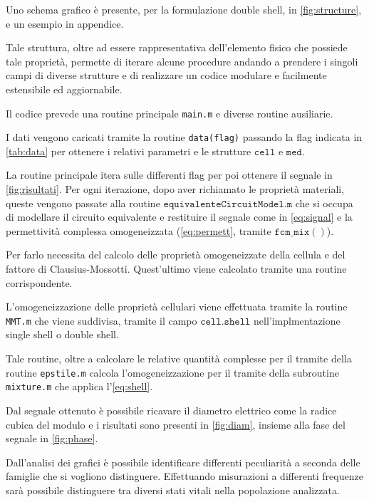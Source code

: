 Uno schema grafico è presente, per la formulazione double shell, in \cref{fig:structure}, e un esempio in appendice.

Tale struttura, oltre ad essere rappresentativa dell'elemento fisico che possiede tale proprietà, permette di iterare alcune procedure andando a prendere i singoli campi di diverse strutture e di realizzare un codice modulare e facilmente estensibile ed aggiornabile.

Il codice prevede una routine principale \texttt{main.m} e diverse routine ausiliarie.

I dati vengono caricati tramite la routine \texttt{data(flag)} passando la flag indicata in \cref{tab:data} per ottenere i relativi parametri e le strutture $\mathtt{cell}$ e $\mathtt{med}$.

La routine principale itera sulle differenti flag per poi ottenere il segnale in \cref{fig:risultati}. Per ogni iterazione, dopo aver richiamato le proprietà materiali, queste vengono passate alla routine $\mathtt{equivalenteCircuitModel.m}$ che si occupa di modellare il circuito equivalente e restituire il segnale come in \cref{eq:signal} e la permettività complessa omogeneizzata (\cref{eq:permett}, tramite $\mathtt{fcm\_mix()}$).

Per farlo necessita del calcolo delle proprietà omogeneizzate della cellula e del fattore di Clausius-Mossotti. Quest'ultimo viene calcolato tramite una routine corrispondente. 

L'omogeneizzazione delle proprietà cellulari viene effettuata tramite la routine \texttt{MMT.m} che viene suddivisa, tramite il campo $\mathtt{cell.shell}$ nell'implmentazione single shell o double shell.  

Tale routine, oltre a calcolare le relative quantità complesse per il tramite della routine \texttt{epstile.m} calcola l'omogeneizzazione per il tramite della subroutine \texttt{mixture.m} che applica l'\cref{eq:shell}.

Dal segnale ottenuto è possibile ricavare il diametro elettrico come la radice cubica del modulo e i risultati sono presenti in \cref{fig:diam}, insieme alla fase del segnale in \cref{fig:phase}.

Dall'analisi dei grafici è possibile identificare differenti peculiarità a seconda delle famiglie che si vogliono distinguere. Effettuando misurazioni a differenti frequenze sarà possibile distinguere tra diversi stati vitali nella popolazione analizzata.




